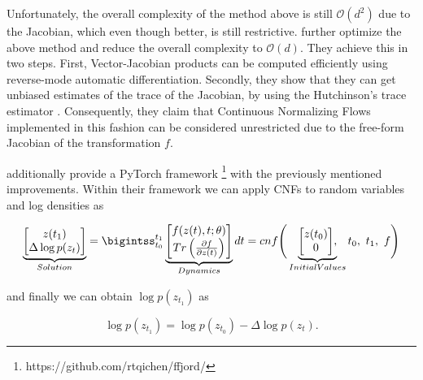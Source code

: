 Unfortunately, the overall complexity of the method above is still $ \mathcal{O}(d^2) $ due to the Jacobian, which even though better, is still restrictive. \citet{grathwohl2018ffjord} further optimize the above method and reduce the overall complexity to $ \mathcal{O}(d) $. They achieve this in two steps. First, Vector-Jacobian products can be computed efficiently using reverse-mode automatic differentiation. Secondly, they show that they can get unbiased estimates of the trace of the Jacobian, by using the Hutchinson’s trace estimator \citep{hutchinson1990stochastic}. Consequently, they claim that Continuous Normalizing Flows implemented in this fashion can be considered unrestricted due to the free-form Jacobian of the transformation $ f $.

\citet{grathwohl2018ffjord} additionally provide a PyTorch framework \footnote{https://github.com/rtqichen/ffjord/} with the previously mentioned improvements. Within their framework we can apply CNFs to random variables and log densities as

\begin{displaymath}
    \underbrace{
        \begin{matrix}
            \begin{bmatrix}
                z(t_1) \\
                \Delta \log p(z_t) %
            \end{bmatrix}
        \end{matrix}
    }_{Solution}
    =
        \bigintss_{t_0}^{t_1}
        \underbrace{
            \begin{matrix}
                \begin{bmatrix}
                    f(z(t), t; \theta) \\
                    Tr \left ( \frac{\partial f}{\partial z(t)} \right)
                \end{bmatrix}
            \end{matrix}
    }_{Dynamics}
    dt = cnf
    \Bigg (
        \underbrace{
            \begin{matrix}
                \begin{bmatrix}
                    z(t_0) \\
                    0
                \end{bmatrix}
            \end{matrix},
        }_{Initial Values}
        t_0, \ t_1, \ f
    \Bigg )
\end{displaymath}

and finally we can obtain $ \log p(z_{t_1}) $  as 

\begin{displaymath}
    \log p(z_{t_1}) = \log p(z_{t_0}) - \Delta \log p(z_t).
\end{displaymath}

